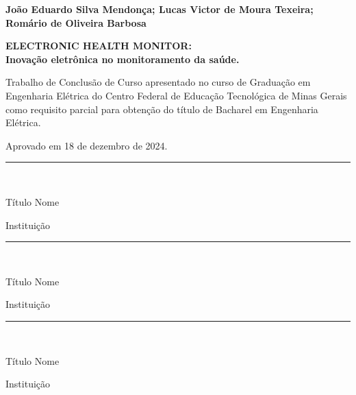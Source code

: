 \thispagestyle{empty}
\begin{titlepage}

\begin{center}

{\large \textbf{João Eduardo Silva Mendonça; Lucas Victor de Moura Texeira; Romário de Oliveira Barbosa}}

\vspace{4cm}

{\large \textbf{ELECTRONIC HEALTH MONITOR: \\ \vspace{0.5 cm} Inovação eletrônica no monitoramento da saúde.}} \\
\vspace{0.7 cm}
\end{center}

\hspace{6.5cm}\begin{minipage}{8 cm}
     \nohyphens{Trabalho de Conclusão de Curso apresentado no curso de Graduação em Engenharia Elétrica do Centro Federal de Educação Tecnológica de Minas Gerais como requisito parcial para obtenção do título de Bacharel em Engenharia Elétrica.}


\end{minipage}

\vspace{1 cm}

Aprovado em 18 de dezembro de 2024.
\vspace{2 cm}

\begin{center}
\rule{10 cm}{1pt} \\
\vspace{0.3 cm}

Título Nome \\

\vspace{0.2 cm}

Instituição

\vspace{1 cm}

\rule{10 cm}{1pt} \\
\vspace{0.3 cm}

Título Nome \\

\vspace{0.2 cm}

Instituição

\vspace{1 cm}

\rule{10 cm}{1pt} \\
\vspace{0.3 cm}

Título Nome \\

\vspace{0.2 cm}

Instituição

\end{center}
\end{titlepage}